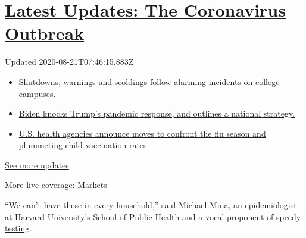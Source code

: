 \hypertarget{latest-updates-the-coronavirus-outbreak}{%
\section{\texorpdfstring{\href{https://www.nytimes3xbfgragh.onion/2020/08/20/world/coronavirus-covid.html?action=click\&pgtype=Article\&state=default\&region=MAIN_CONTENT_1\&context=storylines_live_updates}{Latest
Updates: The Coronavirus
Outbreak}}{Latest Updates: The Coronavirus Outbreak}}\label{latest-updates-the-coronavirus-outbreak}}

Updated 2020-08-21T07:46:15.883Z

\begin{itemize}
\tightlist
\item
  \href{https://www.nytimes3xbfgragh.onion/2020/08/20/world/coronavirus-covid.html?action=click\&pgtype=Article\&state=default\&region=MAIN_CONTENT_1\&context=storylines_live_updates\#link-68774d88}{Shutdowns,
  warnings and scoldings follow alarming incidents on college campuses.}
\item
  \href{https://www.nytimes3xbfgragh.onion/2020/08/20/world/coronavirus-covid.html?action=click\&pgtype=Article\&state=default\&region=MAIN_CONTENT_1\&context=storylines_live_updates\#link-26b58724}{Biden
  knocks Trump's pandemic response, and outlines a national strategy.}
\item
  \href{https://www.nytimes3xbfgragh.onion/2020/08/20/world/coronavirus-covid.html?action=click\&pgtype=Article\&state=default\&region=MAIN_CONTENT_1\&context=storylines_live_updates\#link-4e542da3}{U.S.
  health agencies announce moves to confront the flu season and
  plummeting child vaccination rates.}
\end{itemize}

\href{https://www.nytimes3xbfgragh.onion/2020/08/20/world/coronavirus-covid.html?action=click\&pgtype=Article\&state=default\&region=MAIN_CONTENT_1\&context=storylines_live_updates}{See
more updates}

More live coverage:
\href{https://www.nytimes3xbfgragh.onion/live/2020/08/20/business/stock-market-today-coronavirus?action=click\&pgtype=Article\&state=default\&region=MAIN_CONTENT_1\&context=storylines_live_updates}{Markets}

``We can't have these in every household,'' said Michael Mina, an
epidemiologist at Harvard University's School of Public Health and a
\href{https://www.nytimes3xbfgragh.onion/2020/07/03/opinion/coronavirus-tests.html}{vocal
proponent of speedy testing}.

